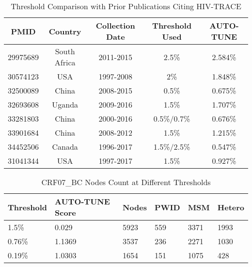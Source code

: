 \documentclass[utf8]{FrontiersinHarvard} %
\begin{document}
\begin{table}[h]
	\caption{Threshold Comparison with Prior Publications Citing HIV-TRACE}
	\vspace{10pt}
	\centering
	\label{tab:paperComparison}
	\begin{tabular}{|c|c|c|c|c|}
		\hline
		PMID     & Country      & Collection Date & Threshold Used & AUTO-TUNE \\
		\hline
		29975689 & South Africa & 2011-2015       & 2.5\%          & 2.584\%   \\
		30574123 & USA          & 1997-2008       & 2\%            & 1.848\%   \\
		32500089 & China        & 2008-2015       & 0.5\%          & 0.675\%   \\
		32693608 & Uganda       & 2009-2016       & 1.5\%          & 1.707\%   \\
		33281803 & China        & 2000-2016       & 0.5\%/0.7\%    & 0.676\%   \\
		33901684 & China        & 2008-2012       & 1.5\%          & 1.215\%   \\
		34452506 & Canada       & 1996-2017       & 1.5\%/2.5\%    & 0.547\%   \\
		31041344 & USA          & 1997-2017       & 1.5\%          & 0.927\%   \\
		\hline
	\end{tabular}
\end{table}


\begin{table}[h!]
\centering
\begin{tabularx}{\textwidth}{|X|X|X|X|X|X|}
\hline
Threshold & AUTO-TUNE Score & Nodes & PWID & MSM & Hetero \\
\hline
1.5\% & 0.029 & 5923 & 559 & 3371 & 1993 \\
0.76\% & 1.1369 & 3537 & 236 & 2271 & 1030 \\
0.19\% & 1.0303 & 1654 & 151 & 1075 & 428 \\
\hline
\end{tabularx}
\caption{CRF07\_BC Nodes Count at Different Thresholds}
\label{table:combined}
\end{table}
\end{document}
